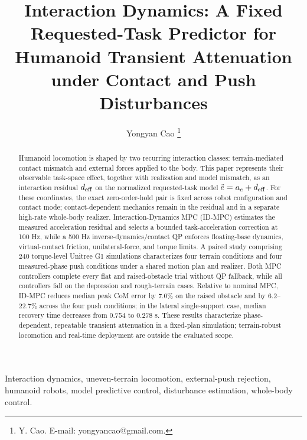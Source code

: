 \documentclass[journal]{IEEEtran}
\theoremstyle{plain}
\theoremstyle{definition}
\begin{document}
\title{Interaction Dynamics: A Fixed Requested-Task Predictor for\\
Humanoid Transient Attenuation under Contact and Push Disturbances}
\author{Yongyan Cao%
\thanks{Y. Cao. E-mail: yongyancao@gmail.com.}}
\maketitle

\begin{abstract}
Humanoid locomotion is shaped by two recurring interaction classes: terrain-mediated contact mismatch and external forces applied to the body. This paper represents their observable task-space effect, together with realization and model mismatch, as an interaction residual \(d_{\rm eff}\) on the normalized requested-task model \(\ddot e=a_e+d_{\rm eff}\). For these coordinates, the exact zero-order-hold pair is fixed across robot configuration and contact mode; contact-dependent mechanics remain in the residual and in a separate high-rate whole-body realizer. Interaction-Dynamics MPC (ID-MPC) estimates the measured acceleration residual and selects a bounded task-acceleration correction at 100 Hz, while a 500 Hz inverse-dynamics/contact QP enforces floating-base dynamics, virtual-contact friction, unilateral-force, and torque limits. A paired study comprising 240 torque-level Unitree G1 simulations characterizes four terrain conditions and four measured-phase push conditions under a shared motion plan and realizer. Both MPC controllers complete every flat and raised-obstacle trial without QP fallback, while all controllers fall on the depression and rough-terrain cases. Relative to nominal MPC, ID-MPC reduces median peak CoM error by 7.0\% on the raised obstacle and by 6.2--22.7\% across the four push conditions; in the lateral single-support case, median recovery time decreases from 0.754 to 0.278 s. These results characterize phase-dependent, repeatable transient attenuation in a fixed-plan simulation; terrain-robust locomotion and real-time deployment are outside the evaluated scope.
\end{abstract}

\begin{IEEEkeywords}
Interaction dynamics, uneven-terrain locomotion, external-push rejection, humanoid robots, model predictive control, disturbance estimation, whole-body control.
\end{IEEEkeywords}
\end{document}
